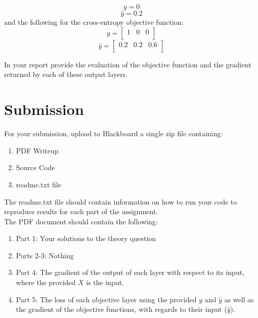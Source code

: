 \documentclass[12pt]{article}
\begin{document}
$$ y = 0$$
$$\hat{y}=0.2$$
\noindent
and the following for the cross-entropy objective function:
$$y = \begin{bmatrix}
1 & 0 & 0\\
\end{bmatrix}$$
$$
\hat{y} = \begin{bmatrix}
0.2 & 0.2 & 0.6\\
\end{bmatrix}
$$

\noindent
In your report provide the evaluation of the objective function and the gradient returned by each of these output layers.

\newpage
\section*{Submission}
For your submission, upload to Blackboard a single zip file containing:

\begin{enumerate}
\item PDF Writeup
\item Source Code
\item readme.txt file
\end{enumerate}

\noindent
The readme.txt file should contain information on how to run your code to reproduce results for each part of the assignment.\\

\noindent
The PDF document should contain the following:

\begin{enumerate}
\item Part 1:  Your solutions to the theory question
\item Parts 2-3:  Nothing
\item Part 4: The gradient of the output of each layer with respect to its input, where the provided $X$ is the input.
\item Part 5: The loss of each objective layer using the provided $y$ and $\hat{y}$ as well as the gradient of the objective functions, with regards to their input ($\hat{y}$). 
\end{enumerate}
\end{document}
